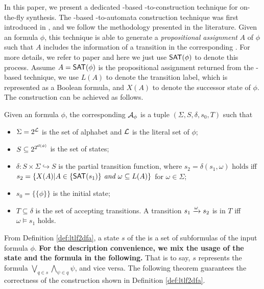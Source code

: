 In this paper, we present a dedicated \SAT-based \ltlf-to-\tdfa construction technique for on-the-fly synthesis. The \SAT-based \ltlf-to-automata construction technique was first introduced in \cite{LRPZV19}, and we follow the methodology presented in the literature. Given an \ltlf formula $\phi$, this technique is able to generate a \emph{propositional assignment} $A$ of $\phi$ such that $A$ includes the information of a transition in the corresponding \NFA \cite{LRPZV19}. For more details,
we refer to paper \cite{LRPZV19} and here we just use $\textsf{SAT}(\phi)$ to denote this process. Assume $A = \textsf{SAT}(\phi)$ is the propositional assignment returned from the \SAT-based technique, we use $L(A)$ to denote the transition label, which is represented as a Boolean formula, and $X(A)$ to denote the successor state of $\phi$. The \tdfa construction can be achieved as follows.  

\begin{definition}\label{def:ltlf2dfa}
Given an \ltlf formula $\phi$, the corresponding \TDFA ${\mathcal{A}_{\phi}}$ is a tuple $(\Sigma, S, \delta, s_0, T)$ such that
\begin{itemize}
	\item $\Sigma = 2^{\mathcal{L}}$ is the set of alphabet and $\mathcal{L}$ is the literal set of $\phi$;
	\item $S\subseteq 2^{2^{{\sf cl}(\phi)}}$ is the set of states;
	\item $\delta:  S \times \Sigma \hookrightarrow S$ is the partial transition function, where $s_2 = \delta(s_1, \omega) \mbox{ holds}$ iff $s_2=\{X(A) | A\in\{\textsf{SAT}(s_1)\}\textit{ and }\omega \subseteq L(A)\}$ for $\omega \in \Sigma$;
	\item $s_0 = \{\{\phi \}\}$ is the initial state;
	\item $T\subseteq \delta$ is the set of accepting transitions. A transition $s_1\xrightarrow[]{\omega}s_2$ is in $T$ iff $\omega\models s_1$ holds. 
\end{itemize}

\end{definition}

From Definition \ref{def:ltlf2dfa}, a state $s$ of the \tdfa is a set of subformulas of the input formula $\phi$. \textbf{For the description convenience, we mix the usage of the state and the formula in the following.} That is to say, $s$ represents the formula $\bigvee_{q\in s}\bigwedge_{\psi\in q} \psi$, and vice versa. The following theorem guarantees the correctness of the \tdfa construction shown in Definition \ref{def:ltlf2dfa}. 


